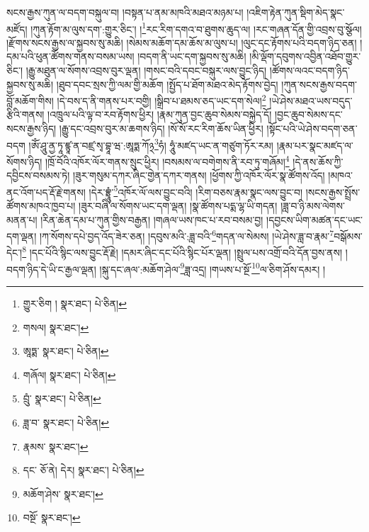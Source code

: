 སངས་རྒྱས་ཀུན་ལ་བདག་བསྐུལ་བ། །བསྟན་པ་ནམ་མཁའི་མཐའ་མཉམ་པ། །འཇིག་རྟེན་ཀུན་སྡིག་མེད་སྣང་མཛོད། །ཀུན་རྟོག་མ་ལུས་དག་:གྱུར་ཅིང་། །\footnote{གྱུར་ཅིག །  སྣར་ཐང་།  པེ་ཅིན། }རང་རིག་དགའ་བ་ཐུགས་ཆུད་ལ། །རང་གཞན་དོན་གྱི་འབྲས་བུ་སྩོལ། །རྫོགས་སངས་རྒྱས་ལ་སྐྱབས་སུ་མཆི། །སེམས་མཆོག་དམ་ཆོས་མ་ལུས་པ། །ལུང་དང་རྟོགས་པའི་བདག་ཉིད་ཅན། །དམ་པའི་ཕུན་ཚོགས་གནས་བསམ་ཡས། །བདག་ནི་ཡང་དག་སྐྱབས་སུ་མཆི། །མི་ལྡོག་དབུགས་འབྱིན་འཐོབ་གྱུར་ཅིང་། །རྒྱུ་མཐུན་ལ་སོགས་འབྲས་བུར་ལྡན། །གསང་བའི་དབང་བསྐུར་ལས་བྱུང་ཉིད། །ཚོགས་ལའང་བདག་ཉིད་སྐྱབས་སུ་མཆི། །ཐུབ་དབང་སྲས་ཀྱི་ལམ་གྱི་མཆོག །སྤྱོད་པ་ཐོག་མཐའ་མེད་རྟོགས་བྱེད། །ཀུན་སངས་རྒྱས་བདག་བློ་མཆོག་གིས། །དེ་བས་ད་ནི་གནས་པར་བགྱི། །སྒྲིབ་པ་ཐམས་ཅད་ཡང་དག་སེལ།\footnote{གསལ།  སྣར་ཐང་། } །ཡེ་ཤེས་མཐའ་ཡས་བདུད་རྩིའི་གནས། །འཁྲུལ་པའི་ལྟ་བ་རབ་རྟོགས་ཕྱིར། །རྣམ་ཀུན་བྱང་ཆུབ་སེམས་བསྐྱེད་དོ། །བྱང་ཆུབ་སེམས་དང་སངས་རྒྱས་ཉིད། །རྒྱུ་དང་འབྲས་བུར་མ་ཆགས་ཉིད། །སོ་སོ་རང་རིག་ཆོས་ཡིན་ཕྱིར། །སྟོང་པའི་ཡེ་ཤེས་བདག་ཅན་བདག །ཨོཾ་ཤཱུ་ནྱ་ཏཱ་ཛྙཱ་ན་བཛྲ་སྭ་བྷཱ་ཝ་:ཨཱཏྨ་ཀོ྅\footnote{ཨཱཏྨ་  སྣར་ཐང་།  པེ་ཅིན། }ཧཾ། ཧཱུཾ་མཛད་ཡང་ན་གཙུག་ཏོར་རམ། །རྣམ་པར་སྣང་མཛད་ལ་སོགས་ཉིད། །ཁྲོ་བོའི་འཁོར་ལོར་གནས་སྲུང་ཕྱིར། །བསམས་ལ་བགེགས་ནི་རབ་ཏུ་གཞོམ།\footnote{གཞོལ།  སྣར་ཐང་།  པེ་ཅིན། } །དེ་ནས་ཆོས་ཀྱི་དབྱིངས་བསམས་ཏེ། །ཟུར་གསུམ་དཀར་ཞིང་གྱེན་དཀར་གནས། །ཕྱོགས་ཀྱི་འཁོར་ལོར་སྣ་ཚོགས་འོད། །མཁའ་ནང་འོག་པད་རྡོ་རྗེ་གནས། །དེར་བྷྲཱུཾ་\footnote{བྲུཾ་  སྣར་ཐང་།  པེ་ཅིན། }འཁོར་ལོ་ལས་བྱུང་བའི། །རིག་བཅས་རྣམ་སྣང་ལས་བྱུང་བ། །སངས་རྒྱས་སྤྲོས་ཚོགས་མཁའ་ཁྱབ་པ། །ཟུར་བཞི་ལ་སོགས་ཡང་དག་ལྡན། །སྣ་ཚོགས་པདྨ་ལྷ་ཡི་གདན། །ཟླ་བ་ཉི་མས་ལེགས་མནན་པ། །རིན་ཆེན་དམ་པ་ཀུན་གྱིས་བརྒྱན། །གཞལ་ཡས་ཁང་པ་རབ་བསམ་བྱ། །དབྱངས་ཡིག་མཚན་དང་ཡང་དག་ལྡན། །ཀ་སོགས་དཔེ་བྱད་འོད་ཟེར་ཅན། །དབུས་མའི་:ཟླ་བའི་\footnote{ཟླ་བ་  སྣར་ཐང་།  པེ་ཅིན། }གདན་ལ་སེམས། །ཡེ་ཤེས་ཟླ་བ་རྣམ་\footnote{རྣམས་  སྣར་ཐང་། }བསྒོམས་དེང་།\footnote{དང་  ཅོ་ནེ། དེར།  སྣར་ཐང་།  པེ་ཅིན། } །དང་པོའི་སྙིང་ལས་བྱུང་རྡོ་རྗེ། །དམར་ཞིང་དང་པོའི་སྙིང་པོར་ལྡན། །སྤྲུལ་པས་འགྲོ་བའི་དོན་བྱས་ནས། །བདག་ཉིད་དེ་ཡི་ང་རྒྱལ་ལྡན། །སྐུ་དང་ཞལ་:མཆོག་ཤེལ་\footnote{མཆོག་ཤེས་  སྣར་ཐང་། }ཟླ་འདྲ། །གཡས་པ་སྔོ་\footnote{བསྔོ་  སྣར་ཐང་། }ལ་ཅིག་ཤོས་དམར། །
